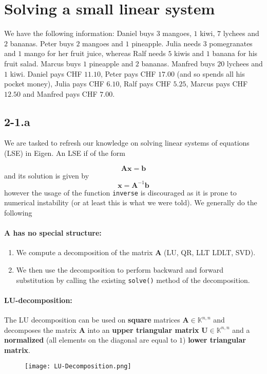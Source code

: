 \documentclass{article}
\begin{document}
\section*{Solving a small linear system}
We have the following information: Daniel buys $3$ mangoes, $1$ kiwi, $7$ lychees and $2$ bananas. Peter buys
$2$ mangoes and $1$ pineapple. Julia needs $3$ pomegranates and $1$ mango for her fruit juice, whereas Ralf
needs $5$ kiwis and $1$ banana for his fruit salad. Marcus buys $1$ pineapple and $2$ bananas. Manfred buys $20$
lychees and $1$ kiwi. Daniel pays CHF $11.10$, Peter pays CHF $17.00$ (and so spends all his pocket money),
Julia pays CHF $6.10$, Ralf pays CHF $5.25$, Marcus pays CHF $12.50$ and Manfred pays CHF $7.00$.

\subsection*{2-1.a} We are tasked to refresh our knowledge on solving linear systems of equations (LSE) in Eigen. An LSE if of the form 

\begin{equation*}
    \mathbf{A}\mathbf{x} = \mathbf{b}
\end{equation*}
and its solution is given by
\begin{equation*}
    \mathbf{x}=\mathbf{A}^{-1}\mathbf{b}
\end{equation*}
however the usage of the function \verb|inverse| is discouraged as it is prone to numerical instability (or at least this is what we were told). We generally do the following 
\paragraph{$\mathbf{A}$ has no special structure:}
\begin{enumerate}
    \item We compute a decomposition of the matrix $\mathbf{A}$ (LU, QR, LLT LDLT, SVD).
    \item We then use the decomposition to perform backward and forward substitution by calling the existing \verb|solve()| method of the decomposition.
\end{enumerate}
\paragraph{LU-decomposition:} The LU decomposition can be used on \textbf{square} matrices $\mathbf{A}\in \mathbb{K}^{n,n}$ and decomposes the matrix $\mathbf{A}$ into an \textbf{upper triangular matrix} $\mathbf{U}\in \mathbb{K}^{n,n}$ and a \textbf{normalized} (all elements on the diagonal are equal to $1$) \textbf{lower triangular matrix}. 
\begin{figure}[!hbt]
    \centering
\texttt{[image: LU-Decomposition.png]}
\end{figure}
\end{document}
